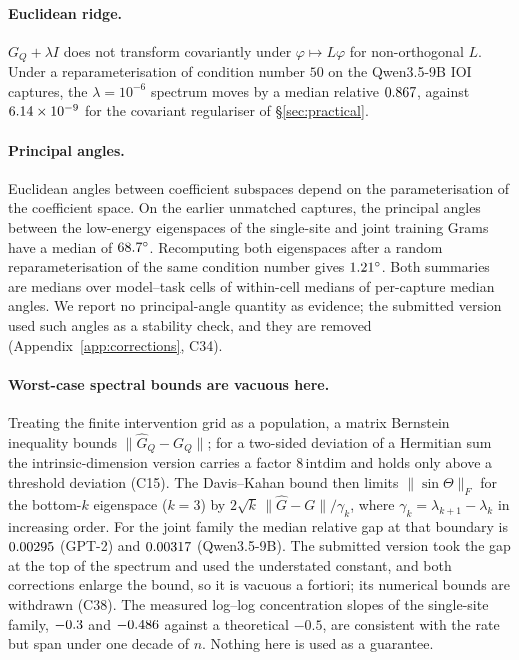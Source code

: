 \paragraph{Euclidean ridge.} $G_Q+\lambda I$ does not transform covariantly under $\varphi\mapsto L\varphi$ for
non-orthogonal $L$. Under a reparameterisation of condition number $50$ on the Qwen3.5-9B IOI captures, the
$\lambda=10^{-6}$ spectrum moves by a median relative $0.867$, against $6.14\times10^{-9}$ for the covariant
regulariser of \S\ref{sec:practical}.

\paragraph{Principal angles.} Euclidean angles between coefficient subspaces depend on the parameterisation of the
coefficient space. On the earlier unmatched captures, the principal angles between the low-energy eigenspaces of the single-site and
joint training Grams have a median of $68.7^\circ$. Recomputing both eigenspaces after a random
reparameterisation of the same condition number gives $1.21^\circ$. Both summaries are medians over model--task
cells of within-cell medians of per-capture median angles. We report no principal-angle quantity as evidence; the submitted version used such angles as a
stability check, and they are removed (Appendix~\ref{app:corrections}, C34).

\paragraph{Worst-case spectral bounds are vacuous here.} Treating the finite intervention grid as a population, a
matrix Bernstein inequality \citep{tropp2015introduction} bounds $\|\widehat G_Q-G_Q\|$; for a two-sided deviation of a
Hermitian sum the intrinsic-dimension version carries a factor $8\,\mathrm{intdim}$ and holds only above a threshold
deviation (C15). The Davis--Kahan bound \citep{yu2015davis} then limits $\|\sin\Theta\|_F$ for the bottom-$k$
eigenspace ($k=3$) by $2\sqrt k\,\|\widehat G-G\|/\gamma_k$, where $\gamma_k=\lambda_{k+1}-\lambda_k$ in increasing
order. For the joint family the median relative gap at that boundary is $0.00295$ (GPT-2) and
$0.00317$ (Qwen3.5-9B). The submitted version took the gap at the top of the spectrum and used the
understated constant, and both corrections enlarge the bound, so it is vacuous a fortiori; its numerical bounds are
withdrawn (C38). The measured log--log concentration slopes of the single-site family, $-0.3$ and
$-0.486$ against a theoretical $-0.5$, are consistent with the rate but span under one decade of $n$.
Nothing here is used as a guarantee.

